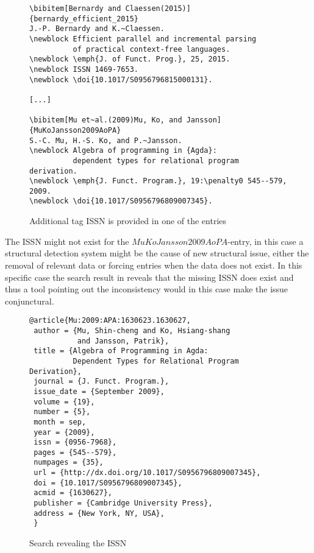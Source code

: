 \begin{figure}
  \centering
  \begin{small}
\begin{verbatim}
\bibitem[Bernardy and Claessen(2015)]{bernardy_efficient_2015}
J.-P. Bernardy and K.~Claessen.
\newblock Efficient parallel and incremental parsing
          of practical context-free languages.
\newblock \emph{J. of Funct. Prog.}, 25, 2015.
\newblock ISSN 1469-7653.
\newblock \doi{10.1017/S0956796815000131}.

[...]

\bibitem[Mu et~al.(2009)Mu, Ko, and Jansson]{MuKoJansson2009AoPA}
S.-C. Mu, H.-S. Ko, and P.~Jansson.
\newblock Algebra of programming in {Agda}:
          dependent types for relational program derivation.
\newblock \emph{J. Funct. Program.}, 19:\penalty0 545--579, 2009.
\newblock \doi{10.1017/S0956796809007345}.
\end{verbatim}
  \end{small}
  \caption{Additional tag ISSN is provided in one of the entries}
\label{fig:entry_with_issn}
\end{figure}

The ISSN might not exist for the $MuKoJansson2009AoPA$-entry, in this
case a structural detection system might be the cause of new
structural issue, either the removal of relevant data or forcing
entries when the data does not exist.  In this specific case the
search result in  reveals that the
missing ISSN does exist and thus a tool pointing out the inconsistency
would in this case make the issue conjunctural.

\begin{figure}
  \centering
\begin{verbatim}
@article{Mu:2009:APA:1630623.1630627,
 author = {Mu, Shin-cheng and Ko, Hsiang-shang 
           and Jansson, Patrik},
 title = {Algebra of Programming in Agda: 
          Dependent Types for Relational Program Derivation},
 journal = {J. Funct. Program.},
 issue_date = {September 2009},
 volume = {19},
 number = {5},
 month = sep,
 year = {2009},
 issn = {0956-7968},
 pages = {545--579},
 numpages = {35},
 url = {http://dx.doi.org/10.1017/S0956796809007345},
 doi = {10.1017/S0956796809007345},
 acmid = {1630627},
 publisher = {Cambridge University Press},
 address = {New York, NY, USA},
 }
\end{verbatim}
  \caption{Search revealing the ISSN}
\label{fig:entry_issn_found}
\end{figure}

